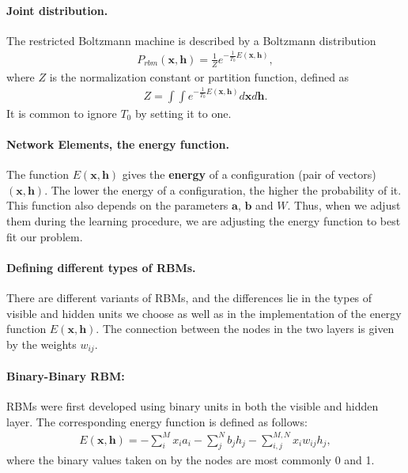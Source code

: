 \documentclass[%
oneside,                 %
final,                   %
10pt]{article}
\begin{document}
\noindent
\paragraph{Joint distribution.}
The restricted Boltzmann machine is described by a Boltzmann distribution
\begin{align}
	P_{rbm}(\mathbf{x},\mathbf{h}) = \frac{1}{Z} e^{-\frac{1}{T_0}E(\mathbf{x},\mathbf{h})},
\end{align}
where $Z$ is the normalization constant or partition function, defined as 
\begin{align}
	Z = \int \int e^{-\frac{1}{T_0}E(\mathbf{x},\mathbf{h})} d\mathbf{x} d\mathbf{h}.
\end{align}
It is common to ignore $T_0$ by setting it to one. 

\paragraph{Network Elements, the energy function.}
The function $E(\mathbf{x},\mathbf{h})$ gives the \textbf{energy} of a
configuration (pair of vectors) $(\mathbf{x}, \mathbf{h})$. The lower
the energy of a configuration, the higher the probability of it. This
function also depends on the parameters $\mathbf{a}$, $\mathbf{b}$ and
$W$. Thus, when we adjust them during the learning procedure, we are
adjusting the energy function to best fit our problem.

\paragraph{Defining different types of RBMs.}
There are different variants of RBMs, and the differences lie in the types of visible and hidden units we choose as well as in the implementation of the energy function $E(\mathbf{x},\mathbf{h})$. The connection between the nodes in the two layers is given by the weights $w_{ij}$. 


\paragraph{Binary-Binary RBM:}

RBMs were first developed using binary units in both the visible and hidden layer. The corresponding energy function is defined as follows:
\begin{align}
	E(\mathbf{x}, \mathbf{h}) = - \sum_i^M x_i a_i- \sum_j^N b_j h_j - \sum_{i,j}^{M,N} x_i w_{ij} h_j,
\end{align}
where the binary values taken on by the nodes are most commonly 0 and 1.
\end{document}
